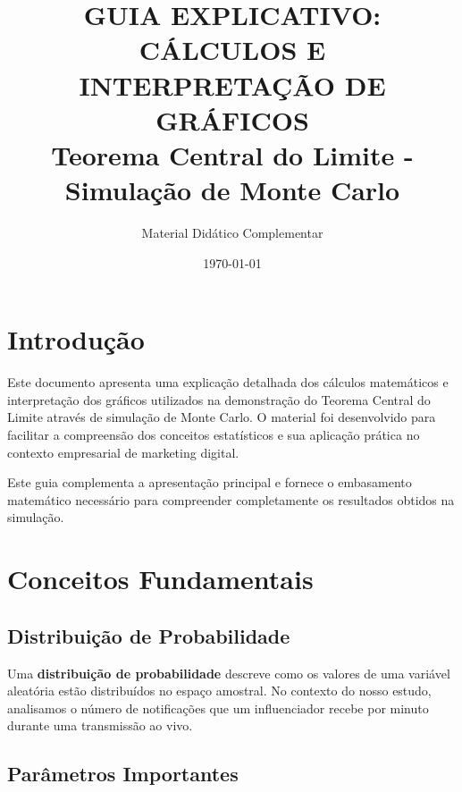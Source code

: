 \documentclass[12pt,a4paper]{article}
\title{\textbf{GUIA EXPLICATIVO: CÁLCULOS E INTERPRETAÇÃO DE GRÁFICOS}\\
\large Teorema Central do Limite - Simulação de Monte Carlo}
\author{Material Didático Complementar}
\date{\today}
\begin{document}
\maketitle

\tableofcontents
\newpage

\section{Introdução}

Este documento apresenta uma explicação detalhada dos cálculos matemáticos e interpretação dos gráficos utilizados na demonstração do Teorema Central do Limite através de simulação de Monte Carlo. O material foi desenvolvido para facilitar a compreensão dos conceitos estatísticos e sua aplicação prática no contexto empresarial de marketing digital.

\begin{importante}
Este guia complementa a apresentação principal e fornece o embasamento matemático necessário para compreender completamente os resultados obtidos na simulação.
\end{importante}

\section{Conceitos Fundamentais}

\subsection{Distribuição de Probabilidade}

\begin{definicao}
Uma \textbf{distribuição de probabilidade} descreve como os valores de uma variável aleatória estão distribuídos no espaço amostral. No contexto do nosso estudo, analisamos o número de notificações que um influenciador recebe por minuto durante uma transmissão ao vivo.
\end{definicao}

\subsection{Parâmetros Importantes}
\end{document}

